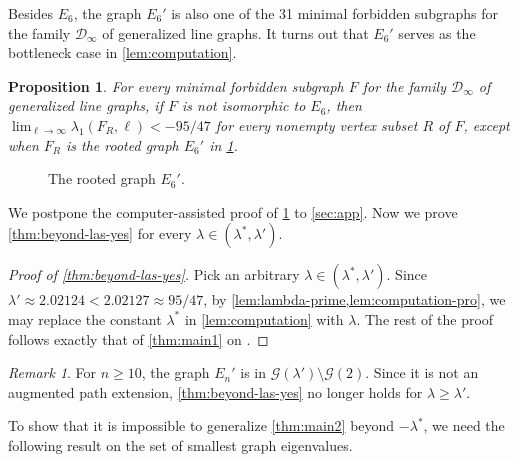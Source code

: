 \documentclass[11pt]{article}
\newtheorem{proposition}[theorem]{Proposition}
\theoremstyle{definition}
\theoremstyle{remark}
\newtheorem*{remark}{Remark}
\newcommand{\la}{\lambda}
\newcommand{\las}{\lambda^*}
\newcommand{\D}{\mathcal{D}}
\newcommand{\G}{\mathcal{G}}
\begin{document}
Besides $E_6$, the graph $E_6'$ is also one of the 31 minimal forbidden subgraphs for the family $\D_\infty$ of generalized line graphs. It turns out that $E_6'$ serves as the bottleneck case in \cref{lem:computation}.

\begin{proposition} \label{lem:computation-pro}
    For every minimal forbidden subgraph $F$ for the family $\D_\infty$ of generalized line graphs, if $F$ is not isomorphic to $E_6$, then $\lim_{\ell \to \infty}\la_1(F_R, \ell) < -95/47$ for every nonempty vertex subset $R$ of $F$, except when $F_R$ is the rooted graph $E_6'$ in \cref{fig:rooted-e2-prime}.
\end{proposition}

\begin{figure}[t]
    \centering
    \caption{The rooted graph $E_6'$.} \label{fig:rooted-e2-prime}
\end{figure}

We postpone the computer-assisted proof of \cref{lem:computation-pro} to \cref{sec:app}. Now we prove \cref{thm:beyond-las-yes} for every $\la \in (\las, \la')$.

\begin{proof}[Proof of \cref{thm:beyond-las-yes}]
    Pick an arbitrary $\la \in (\las, \la')$. Since $\la' \approx 2.02124 < 2.02127 \approx 95/47$, by \cref{lem:lambda-prime,lem:computation-pro}, we may replace the constant $\las$ in \cref{lem:computation} with $\la$. The rest of the proof follows exactly that of \cref{thm:main1} on .
\end{proof}

\begin{remark}
    For $n \ge 10$, the graph $E_n'$ is in $\G(\la') \setminus \G(2)$. Since it is not an augmented path extension, \cref{thm:beyond-las-yes} no longer holds for $\la \ge \la'$.
\end{remark}

To show that it is impossible to generalize \cref{thm:main2} beyond $-\las$, we need the following result on the set of smallest graph eigenvalues.
\end{document}
